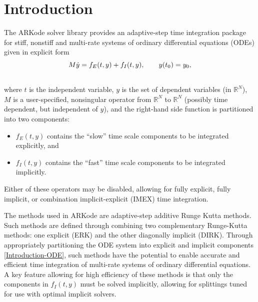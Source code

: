 \documentclass[letterpaper,10pt,english]{sphinxmanual}
\begin{document}
\chapter{Introduction}
\label{Introduction:introduction}\label{Introduction:id1}\label{Introduction::doc}\label{Introduction:arkode-documentation}
The ARKode solver library provides an adaptive-step time integration
package for stiff, nonstiff and multi-rate systems of ordinary
differential equations (ODEs) given in explicit form
\label{Introduction:equation-ODE}\begin{gather}
\begin{split}M \dot{y} = f_E(t,y) + f_I(t,y),  \qquad y(t_0) = y_0,\end{split}\label{Introduction-ODE}\\\begin{split}\end{split}\notag
\end{gather}
where $t$ is the independent variable, $y$ is the set of
dependent variables (in $\mathbb{R}^N$), $M$ is a
user-specified, nonsingular operator from $\mathbb{R}^N$ to
$\mathbb{R}^N$ (possibly time dependent, but independent of
$y$), and the right-hand side function is partitioned into two
components:
\begin{itemize}
\item {} 
$f_E(t,y)$ contains the ``slow'' time scale components to be
integrated explicitly, and

\item {} 
$f_I(t,y)$  contains the ``fast'' time scale components to be
integrated implicitly.

\end{itemize}

Either of these operators may be disabled, allowing for fully
explicit, fully implicit, or combination implicit-explicit (IMEX) time
integration.

The methods used in ARKode are adaptive-step additive Runge Kutta
methods. Such methods are defined through combining two complementary
Runge-Kutta methods: one explicit (ERK) and the other diagonally implicit
(DIRK). Through appropriately partitioning the ODE system into
explicit and implicit components \eqref{Introduction-ODE}, such methods have the
potential to enable accurate and efficient time integration of
multi-rate systems of ordinary differential equations.  A key
feature allowing for high efficiency of these methods is that only the
components in $f_I(t,y)$ must be solved implicitly, allowing for
splittings tuned for use with optimal implicit solvers.
\end{document}
